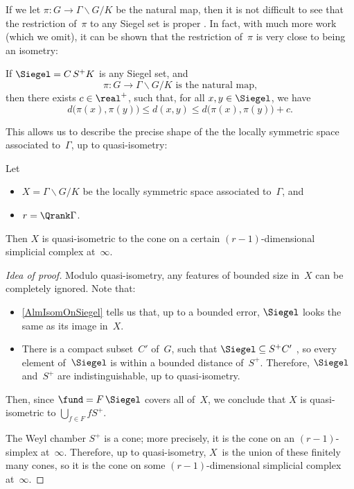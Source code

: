 If we let $\pi \colon G \to \Gamma \backslash G / K$ be the natural map,
then it is not difficult to see that the restriction of~$\pi$ to any Siegel set is proper . 
In fact, with much more work (which we omit), it can be shown that the restriction of~$\pi$ is very close to being an isometry:

\begin{thm} \label{AlmIsomOnSiegel}
If\/ $\Siegel = C \, S^+ K$ is any Siegel set, and
	$$ \text{$\pi \colon G \to \Gamma \backslash G / K$ is the natural map,} $$
then there exists $c \in \real^+$, such that, for all $x,y \in \Siegel$, we have
	$$ d \bigl( \pi(x), \pi(y) \bigr) \le d( x,y) \le d \bigl( \pi(x), \pi(y) \bigr) + c .$$
\end{thm}

This allows us to describe the precise shape of the the locally symmetric space associated to~$\Gamma$, up to quasi-isometry:

\begin{thm}
Let 
	\begin{itemize}
	\item $X = \Gamma \backslash G/K$ be the locally symmetric space associated to~$\Gamma$, 
	and 
	\item $r = \Qrank \Gamma$.
	\end{itemize}
Then $X$ is quasi-isometric to the cone on a certain $(r-1)$-dimensional simplicial complex at~$\infty$.
\end{thm}

\begin{proof}[Idea of proof]
Modulo quasi-isometry, any features of bounded size in~$X$ can be completely ignored. Note that:
	\begin{itemize}
	\item \cref{AlmIsomOnSiegel} tells us that, up to a bounded error, $\Siegel$ looks the same as its image in~$X$. 	
	\item There is a compact subset~$C'$ of~$G$, such that $\Siegel \subseteq S^+C'$ , so every element of~$\Siegel$ is within a bounded distance of~$S^+$. 
Therefore, $\Siegel$ and~$S^+$ are indistinguishable, up to quasi-isometry.
	\end{itemize}
Then, since $\fund = F \, \Siegel$ covers all of~$X$, we conclude that $X$ is quasi-isometric to $ \bigcup_{f \in F} f S^+ $.

The Weyl chamber $S^+$ is a cone; more precisely, it is the cone on an $(r-1)$-simplex at~$\infty$. Therefore, up to quasi-isometry, $X$~is the union of these finitely many cones, so it is the cone on some $(r-1)$-dimensional simplicial complex at~$\infty$.
\end{proof}
 
